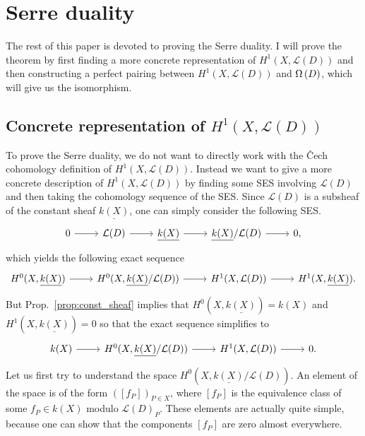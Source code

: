 \section{Serre duality}
The rest of this paper is devoted to proving the Serre duality.
I will prove the theorem by first finding a more concrete representation of
$H^{1}(X,\mathcal{L}(D))$ and then constructing a perfect pairing between
$H^{1}(X,\mathcal{L}(D))$ and $\Omega\left(D\right)$,
which will give us the isomorphism.

\subsection{Concrete representation of $H^{1}(X,\mathcal{L}(D))$}
To prove the Serre duality, we do not want to directly work with the \v Cech
cohomology definition of $H^{1}(X,\mathcal{L}(D))$.
Instead we want to give a more concrete description of
$H^{1}(X,\mathcal{L}(D))$ by finding some SES involving $\mathcal{L}(D)$
and then taking the cohomology sequence of the SES. Since $\mathcal{L}(D)$ is
a subsheaf of the constant sheaf $\underline{k(X)}$, one can simply consider
the following SES.
\[
  \begin{tikzcd}
    0\rar & \mathcal{L}(D)\rar & \underline{k(X)}\rar
    & \underline{k(X)}/\mathcal{L}(D)\rar & 0,
  \end{tikzcd}
\]
which yields the following exact sequence
\[
  \begin{tikzcd}
    H^{0}(X,\underline{k(X)})\rar & H^{0}(X,\underline{k(X)}
    /\mathcal{L}(D))\rar & H^{1}(X,\mathcal{L}(D))\rar
    & H^{1}(X,\underline{k(X)}).
  \end{tikzcd}
\]
But Prop.~\ref{prop:const_sheaf} implies that
$H^{0}(X,\underline{k(X)})=k(X)$ and $H^{1}(X,\underline{k(X)})=0$
so that the exact sequence simplifies to
\begin{equation}\label{eq:repartition_ses}
  \begin{tikzcd}
    k(X)\rar & H^{0}(X,\underline{k(X)}/\mathcal{L}(D))\rar
    & H^{1}(X,\mathcal{L}(D))\rar & 0.
  \end{tikzcd}
\end{equation}
Let us first try to understand the space
$H^{0}(X,\underline{k(X)}/\mathcal{L}(D))$. An element of the space
is of the form $([f_{P}])_{P\in X}$, where $[f_{P}]$ is the equivalence
class of some $f_{P}\in k(X)$ modulo $\mathcal{L}(D)_{P}$.
These elements are actually quite simple, because one can show that the
components $[f_{P}]$ are zero almost everywhere.
